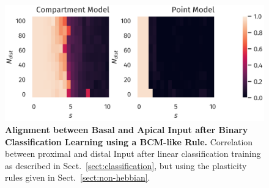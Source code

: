 \documentclass[utf8]{frontiersSCNS} %
\begin{document}
\begin{figure}
\centering
\includegraphics[width=0.7\columnwidth]{classification_correlation_dimension_scaling_bcm_high_input_dim}
\caption{{\bf Alignment between Basal and Apical Input after Binary Classification Learning
		using a BCM-like Rule.}
	Correlation between proximal and distal Input after linear classification 
	training as described in Sect.~\ref{sect:classification}, but using the plasticity
	rules given in Sect.~\ref{sect:non-hebbian}.}
\label{fig:classification_correlation_bcm}
\end{figure}
\end{document}
